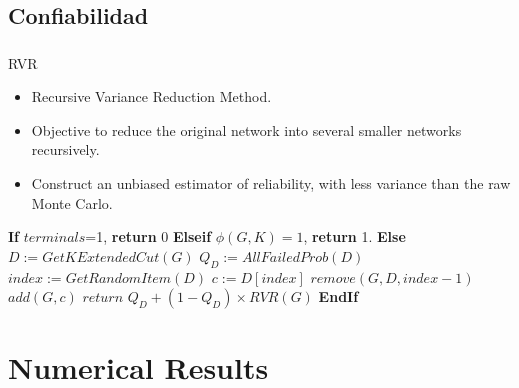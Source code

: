 \subsection{Confiabilidad}
\begin{frame}\frametitle{}
\begin{block}{RVR}
\begin{scriptsize}
\begin{itemize}
 \item Recursive Variance Reduction Method.
 \item Objective to reduce the original network into several smaller networks recursively.
 \item Construct an unbiased estimator of reliability, with less variance than the raw Monte Carlo.
\end{itemize} 
\end{scriptsize}
\end{block}
\begin{block}{}
\begin{algorithm}[H]
\caption{$RVR(G,K,p_v,p_e)$}
\begin{algorithmic}[1]
\begin{tiny}
\STATE \textbf{If} $terminals$=1, \textbf{return} $0$
\STATE \textbf{Elseif} $\phi(G,K)=1$, \textbf{return} 1.
\STATE \textbf{Else} 
\STATE $D := GetKExtendedCut(G)$
\STATE $Q_{D} := AllFailedProb(D)$
\STATE $index := GetRandomItem(D)$
\STATE $c := D[index]$
\STATE $remove(G,D, index - 1)$
\STATE $add(G, c)$
\STATE $return \, \, Q_{D} + (1 - Q_{D})\times RVR(G)$
\STATE \textbf{EndIf}
\end{tiny}
\end{algorithmic}
\end{algorithm}
\end{block}
\end{frame}

\section{Numerical Results}
